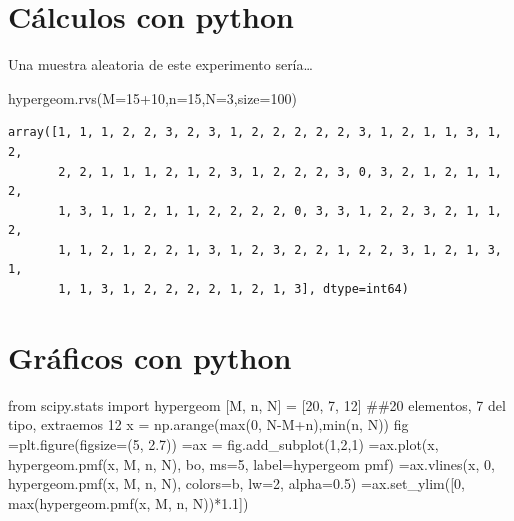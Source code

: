 \documentclass[
  letterpaper,
  DIV=11,
  numbers=noendperiod]{scrreprt}
\newenvironment{Shaded}{\begin{snugshade}}{\end{snugshade}}
\newcommand{\BuiltInTok}[1]{\textcolor[rgb]{0.00,0.23,0.31}{#1}}
\newcommand{\CommentTok}[1]{\textcolor[rgb]{0.37,0.37,0.37}{#1}}
\newcommand{\DecValTok}[1]{\textcolor[rgb]{0.68,0.00,0.00}{#1}}
\newcommand{\FloatTok}[1]{\textcolor[rgb]{0.68,0.00,0.00}{#1}}
\newcommand{\ImportTok}[1]{\textcolor[rgb]{0.00,0.46,0.62}{#1}}
\newcommand{\NormalTok}[1]{\textcolor[rgb]{0.00,0.23,0.31}{#1}}
\newcommand{\OperatorTok}[1]{\textcolor[rgb]{0.37,0.37,0.37}{#1}}
\newcommand{\StringTok}[1]{\textcolor[rgb]{0.13,0.47,0.30}{#1}}
\begin{document}
\section{Cálculos con python}\label{cuxe1lculos-con-python-12}

Una muestra aleatoria de este experimento sería\ldots{}

\begin{Shaded}
\begin{Highlighting}[]
\NormalTok{hypergeom.rvs(M}\OperatorTok{=}\DecValTok{15}\OperatorTok{+}\DecValTok{10}\NormalTok{,n}\OperatorTok{=}\DecValTok{15}\NormalTok{,N}\OperatorTok{=}\DecValTok{3}\NormalTok{,size}\OperatorTok{=}\DecValTok{100}\NormalTok{)}
\end{Highlighting}
\end{Shaded}

\begin{verbatim}
array([1, 1, 1, 2, 2, 3, 2, 3, 1, 2, 2, 2, 2, 2, 3, 1, 2, 1, 1, 3, 1, 2,
       2, 2, 1, 1, 1, 2, 1, 2, 3, 1, 2, 2, 2, 3, 0, 3, 2, 1, 2, 1, 1, 2,
       1, 3, 1, 1, 2, 1, 1, 2, 2, 2, 2, 0, 3, 3, 1, 2, 2, 3, 2, 1, 1, 2,
       1, 1, 2, 1, 2, 2, 1, 3, 1, 2, 3, 2, 2, 1, 2, 2, 3, 1, 2, 1, 3, 1,
       1, 1, 3, 1, 2, 2, 2, 2, 1, 2, 1, 3], dtype=int64)
\end{verbatim}

\section{Gráficos con python}\label{gruxe1ficos-con-python-5}

\begin{Shaded}
\begin{Highlighting}[]
\ImportTok{from}\NormalTok{ scipy.stats }\ImportTok{import}\NormalTok{ hypergeom}
\NormalTok{[M, n, N] }\OperatorTok{=}\NormalTok{ [}\DecValTok{20}\NormalTok{, }\DecValTok{7}\NormalTok{, }\DecValTok{12}\NormalTok{] }\CommentTok{\#\#20 elementos, 7 del tipo, extraemos 12}
\NormalTok{x }\OperatorTok{=}\NormalTok{ np.arange(}\BuiltInTok{max}\NormalTok{(}\DecValTok{0}\NormalTok{, N}\OperatorTok{{-}}\NormalTok{M}\OperatorTok{+}\NormalTok{n),}\BuiltInTok{min}\NormalTok{(n, N))}
\NormalTok{fig }\OperatorTok{=}\NormalTok{plt.figure(figsize}\OperatorTok{=}\NormalTok{(}\DecValTok{5}\NormalTok{, }\FloatTok{2.7}\NormalTok{))}
 \OperatorTok{=}\NormalTok{ax }\OperatorTok{=}\NormalTok{ fig.add\_subplot(}\DecValTok{1}\NormalTok{,}\DecValTok{2}\NormalTok{,}\DecValTok{1}\NormalTok{)}
 \OperatorTok{=}\NormalTok{ax.plot(x, hypergeom.pmf(x, M, n, N), }\StringTok{\textquotesingle{}bo\textquotesingle{}}\NormalTok{, ms}\OperatorTok{=}\DecValTok{5}\NormalTok{, label}\OperatorTok{=}\StringTok{\textquotesingle{}hypergeom pmf\textquotesingle{}}\NormalTok{)}
 \OperatorTok{=}\NormalTok{ax.vlines(x, }\DecValTok{0}\NormalTok{, hypergeom.pmf(x, M, n, N), colors}\OperatorTok{=}\StringTok{\textquotesingle{}b\textquotesingle{}}\NormalTok{, lw}\OperatorTok{=}\DecValTok{2}\NormalTok{, alpha}\OperatorTok{=}\FloatTok{0.5}\NormalTok{)}
 \OperatorTok{=}\NormalTok{ax.set\_ylim([}\DecValTok{0}\NormalTok{, }\BuiltInTok{max}\NormalTok{(hypergeom.pmf(x, M, n, N))}\OperatorTok{*}\FloatTok{1.1}\NormalTok{])}
\end{Highlighting}
\end{Shaded}
\end{document}
